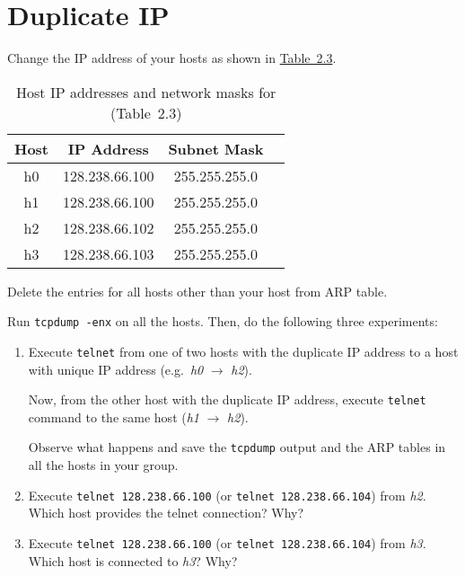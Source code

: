 \documentclass{../UTNetLab}
\begin{document}
\section{Duplicate IP}\label{sec:duplicate-ip}
    Change the IP address of your hosts as shown in \hyperref[tab:2.3]{Table~2.3}.

    \begin{table}[H]
        \caption{Host IP addresses and network masks for  (Table~2.3)}\label{tab:2.3}
        \centering
        \begin{tabular}{ c c c c }
            \hline \hline
            Host & IP Address & Subnet Mask \\
            \hline 
            h0 & 128.238.66.100 & 255.255.255.0 \\
            h1 & 128.238.66.100 & 255.255.255.0 \\
            h2 & 128.238.66.102 & 255.255.255.0 \\
            h3 & 128.238.66.103 & 255.255.255.0 \\
            \hline \hline
            \end{tabular}
    \end{table}

    Delete the entries for all hosts other than your host from ARP table.

    Run \lstinline{tcpdump -enx} on all the hosts.
    Then, do the following three experiments:

    \begin{enumerate}
        \item Execute \lstinline{telnet} from one of two hosts with the duplicate IP address to a host with unique IP address (e.g.\ \textit{h0} $\rightarrow$ \textit{h2}).

        Now, from the other host with the duplicate IP address, execute \lstinline{telnet} command to the same host (\textit{h1} $\rightarrow$ \textit{h2}).

        Observe what happens and save the \lstinline{tcpdump} output and the ARP tables in all the hosts in your group.
        
        \item Execute \lstinline{telnet 128.238.66.100} (or \lstinline{telnet 128.238.66.104}) from \textit{h2}.
        Which host provides the telnet connection?
        Why?
        
        \item Execute \lstinline{telnet 128.238.66.100} (or \lstinline{telnet 128.238.66.104}) from \textit{h3}.
    Which host is connected to \textit{h3}? Why?
    \end{enumerate}
    
\end{document}
